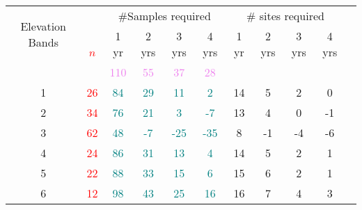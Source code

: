 \begin{table}\scriptsize
\centering
\begin{tabular}{cccccc|ccccc}
\toprule
 \multirow{2}{1cm}{Elevation Bands}  &                                  &   \multicolumn{4}{c}{ \#Samples required} & \multicolumn{4}{c}{\# sites required} \\ \cline{3-10}\noalign{\smallskip}
\multicolumn{1}{c}{}&\multirow{2}{.3cm}{\textcolor{red}{$n$}}  & 1 yr  & 2 yrs   & 3 yrs    & 4 yrs                   & 1 yr   & 2 yrs  & 3 yrs  & 4 yrs\\ 
						&		           &\textcolor{violet}{110} &\textcolor{violet}{55} &\textcolor{violet}{37} &\textcolor{violet}{28}&&&&&\\ \midrule
1                                                                   &\textcolor{red}{26}&    \textcolor{teal}{84}   &  \textcolor{teal}{29}       &  \textcolor{teal}{11}        & \textcolor{teal}{2}                         & 14 & 5  & 2   & 0 \\ 
2                                                                      &\textcolor{red}{34}&  \textcolor{teal}{76} &  \textcolor{teal}{21} &  \textcolor{teal}{3}     &  \textcolor{teal}{-7}                                    & 13 & 4  & 0   & -1 \\ 
3                                                                      &\textcolor{red}{62}&  \textcolor{teal}{48} &  \textcolor{teal}{-7}  &  \textcolor{teal}{-25} &  \textcolor{teal}{-35}                                  & 8   & -1 & -4 & -6 \\
4                                                                      &\textcolor{red}{24}&   \textcolor{teal}{86} &  \textcolor{teal}{31} &  \textcolor{teal}{13}  &  \textcolor{teal}{4}                                      & 14 & 5  & 2  & 1 \\ 
5                                                                      &\textcolor{red}{22}&   \textcolor{teal}{88} &  \textcolor{teal}{33} &  \textcolor{teal}{15}  &  \textcolor{teal}{6}                                      & 15 & 6  & 2  & 1 \\ 
6                                                                     &\textcolor{red}{12}&   \textcolor{teal}{98} &  \textcolor{teal}{43} &  \textcolor{teal}{25}  &  \textcolor{teal}{16}                                     & 16 & 7  & 4  & 3 \\ \bottomrule
\end{tabular}
\label{tab:WQapsenario}
\end{table}